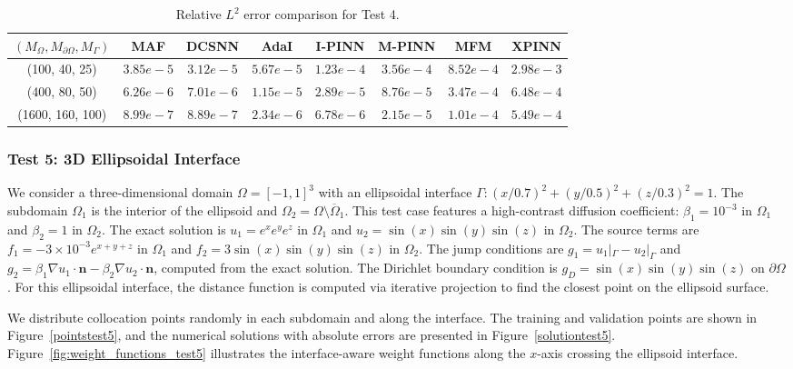 \documentclass{article}
\begin{document}
\begin{table}[H]
    \centering
    \caption{Relative $L^2$ error comparison for Test 4.}
    \label{errortabletest4}
    \small
    \begin{tabular}{|c|c|c|c|c|c|c|c|}
        \hline
        $(M_\Omega, M_{\partial\Omega}, M_\Gamma)$ & MAF & DCSNN & AdaI & I-PINN & M-PINN & MFM & XPINN \\
        \hline
        (100, 40, 25) & $3.85e{-}5$ & $3.12e{-}5$ & $5.67e{-}5$ & $1.23e{-}4$ & $3.56e{-}4$ & $8.52e{-}4$ & $2.98e{-}3$ \\
        \hline
        (400, 80, 50) & $6.26e{-}6$ & $7.01e{-}6$ & $1.15e{-}5$ & $2.89e{-}5$ & $8.76e{-}5$ & $3.47e{-}4$ & $6.48e{-}4$ \\
        \hline
        (1600, 160, 100) & $8.99e{-}7$ & $8.89e{-}7$ & $2.34e{-}6$ & $6.78e{-}6$ & $2.15e{-}5$ & $1.01e{-}4$ & $5.49e{-}4$ \\
        \hline
    \end{tabular}
\end{table}



\subsubsection{Test 5: 3D Ellipsoidal Interface}

We consider a three-dimensional domain $\Omega = [-1,1]^3$ with an ellipsoidal interface $\Gamma: (x/0.7)^2 + (y/0.5)^2 + (z/0.3)^2 = 1$. The subdomain $\Omega_1$ is the interior of the ellipsoid and $\Omega_2 = \Omega \setminus \overline{\Omega}_1$. This test case features a high-contrast diffusion coefficient: $\beta_1 = 10^{-3}$ in $\Omega_1$ and $\beta_2 = 1$ in $\Omega_2$. The exact solution is $u_1 = e^x e^y e^z$ in $\Omega_1$ and $u_2 = \sin(x)\sin(y)\sin(z)$ in $\Omega_2$. The source terms are $f_1 = -3 \times 10^{-3} e^{x+y+z}$ in $\Omega_1$ and $f_2 = 3\sin(x)\sin(y)\sin(z)$ in $\Omega_2$. The jump conditions are $g_1 = u_1|_\Gamma - u_2|_\Gamma$ and $g_2 = \beta_1 \nabla u_1 \cdot \boldsymbol{n} - \beta_2 \nabla u_2 \cdot \boldsymbol{n}$, computed from the exact solution. The Dirichlet boundary condition is $g_D = \sin(x)\sin(y)\sin(z)$ on $\partial\Omega$. For this ellipsoidal interface, the distance function is computed via iterative projection to find the closest point on the ellipsoid surface.

We distribute collocation points randomly in each subdomain and along the interface. The training and validation points are shown in Figure~\ref{pointstest5}, and the numerical solutions with absolute errors are presented in Figure~\ref{solutiontest5}. Figure~\ref{fig:weight_functions_test5} illustrates the interface-aware weight functions along the $x$-axis crossing the ellipsoid interface.
\end{document}
